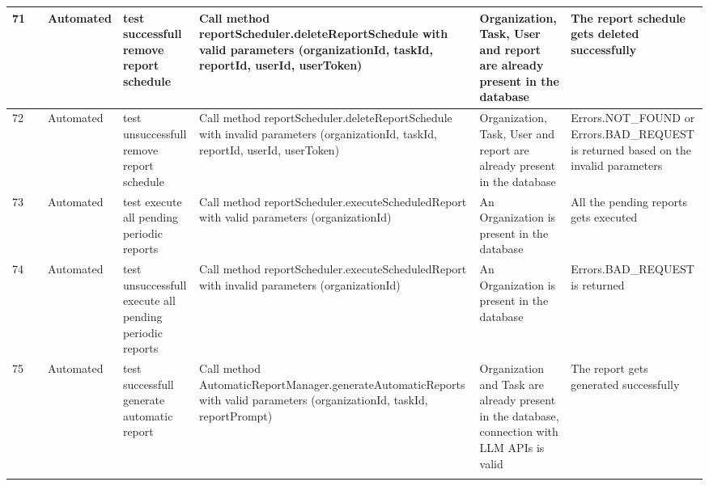 \documentclass{article}
\begin{document}
{\begin{tabular}{|
      >{\columncolor[HTML]{FFFFFF}}l |
      >{\columncolor[HTML]{FFFFFF}}c |
      >{\columncolor[HTML]{FFFFFF}}l |l|l|l|l|}
    71          & \cellcolor[HTML]{FFFFFF}                                      & {\color[HTML]{11734B} Automated} & test successfull remove report schedule                 & Call method reportScheduler.deleteReportSchedule with valid parameters (organizationId, taskId, reportId, userId, userToken)                              & Organization, Task, User and report are already present in the database                            & The report schedule gets deleted successfully                                        \\ \cline{1-1} \cline{3-7}
    72          & \cellcolor[HTML]{FFFFFF}                                      & {\color[HTML]{11734B} Automated} & test unsuccessfull remove report schedule               & Call method reportScheduler.deleteReportSchedule with invalid parameters (organizationId, taskId, reportId, userId, userToken)                            & Organization, Task, User and report are already present in the database                            & Errors.NOT\_FOUND or Errors.BAD\_REQUEST is returned based on the invalid parameters \\ \cline{1-1} \cline{3-7}
    73          & \cellcolor[HTML]{FFFFFF}                                      & {\color[HTML]{11734B} Automated} & test execute all pending periodic reports               & \cellcolor[HTML]{FFFFFF}Call method reportScheduler.executeScheduledReport with valid parameters (organizationId)                                         & An Organization is present in the database                                                         & All the pending reports gets executed                                                \\ \cline{1-1} \cline{3-7}
    74          & \cellcolor[HTML]{FFFFFF}                                      & {\color[HTML]{11734B} Automated} & test unsuccessfull execute all pending periodic reports & \cellcolor[HTML]{FFFFFF}Call method reportScheduler.executeScheduledReport with invalid parameters (organizationId)                                       & An Organization is present in the database                                                         & Errors.BAD\_REQUEST is returned                                                      \\ \cline{1-1} \cline{3-7}
    75          & \cellcolor[HTML]{FFFFFF}                                      & {\color[HTML]{11734B} Automated} & test successfull generate automatic report              & Call method AutomaticReportManager.generateAutomaticReports with valid parameters (organizationId, taskId, reportPrompt)                                  & Organization and Task are already present in the database, connection with LLM APIs is valid       & The report gets generated successfully                                               \\ \cline{1-1} \cline{3-7}

\end{tabular}}
\end{document}
